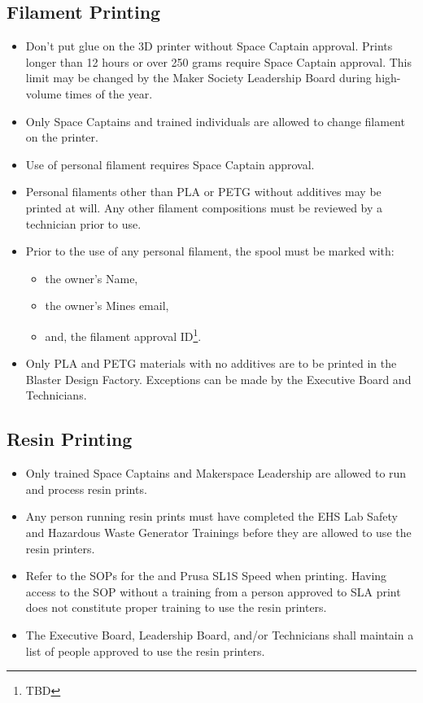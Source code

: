 \documentclass[12pt,letterpaper]{article}
\newcommand{\badd}[1]{
    {\color{darkgreen}#1}
}
\begin{document}
\badd{
\subsection{Filament Printing}

\begin{itemize}
    \item Don’t put glue on the 3D printer without Space Captain approval. 
    Prints longer than 12 hours or over 250 grams require Space Captain approval. This limit may be changed by the Maker Society Leadership Board during high-volume times of the year.
    \item Only Space Captains and trained individuals are allowed to change filament on the printer. 
    \item Use of personal filament requires Space Captain approval.
    \item Personal filaments other than PLA or PETG without additives may be printed at will. Any other filament compositions must be reviewed by a technician prior to use.
    \item Prior to the use of any personal filament,
    the spool must be marked with: 
    \begin{itemize}
        \item the owner's Name,
        \item the owner's Mines email,
        \item and, the filament approval ID\footnote{TBD}.
    \end{itemize}
    \item Only PLA and PETG materials with no additives are to be printed in the Blaster Design Factory. Exceptions can be made by the Executive Board and Technicians. %
\end{itemize}

\subsection{Resin Printing}

\begin{itemize}
    \item Only trained Space Captains and Makerspace Leadership are allowed to run and process resin prints.
    \item Any person running resin prints must have completed the EHS Lab Safety and Hazardous Waste Generator Trainings before they are allowed to use the resin printers.
    \item Refer to the SOPs for the and Prusa SL1S Speed when printing. Having access to the SOP without a training from a person approved to SLA print does not constitute proper training to use the resin printers.
    \item The Executive Board, Leadership Board, and/or Technicians shall maintain a list of people approved to use the resin printers.
\end{itemize}

}
\end{document}
